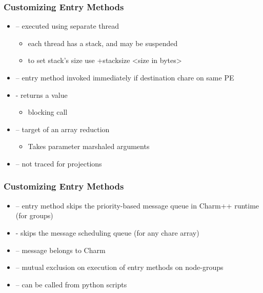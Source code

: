 \begin{frame}[fragile]
  \frametitle{Customizing Entry Methods}
  \begin{itemize}
    \item {} – executed using separate thread
    \begin{itemize}
      \item each thread has a stack, and may be suspended
      \item to set stack’s size use +stacksize <size in bytes> 
    \end{itemize}
    \item {} – entry method invoked immediately if destination chare on same PE
    \item {} - returns a value
    \begin{itemize}
      \item blocking call
    \end{itemize}
    \item {} – target of an array reduction
    \begin{itemize}
      \item Takes parameter marshaled arguments
    \end{itemize}
    \item {} – not traced for projections
  \end{itemize}
\end{frame}

\begin{frame}[fragile]
  \frametitle{Customizing Entry Methods}
  \begin{itemize}
    \item {} – entry method skips the priority-based message queue in Charm++ runtime (for groups)
    \item {} - skips the message scheduling queue (for any chare array)
    \item {} – message belongs to Charm
    \item {} – mutual exclusion on execution of entry methods on node-groups 
    \item {} – can be called from python scripts
  \end{itemize}
\end{frame}

